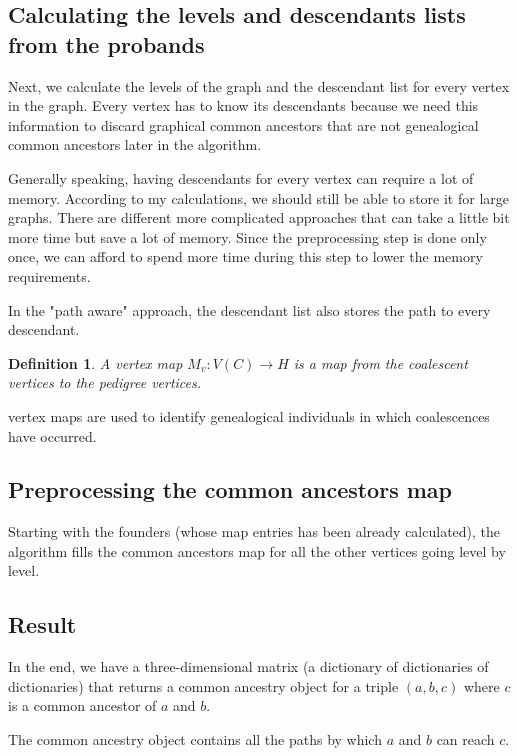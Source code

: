 \documentclass[14pt]{extarticle}
\newtheorem{definition}{Definition}
\begin{document}
\subsection{Calculating the levels and descendants lists from the probands}

Next, we calculate the levels of the graph and the descendant list for every vertex in the graph. Every vertex has to know its descendants because we need this information to discard graphical common ancestors that are not genealogical common ancestors later in the algorithm.

Generally speaking, having descendants for every vertex can require a lot of memory. According to my calculations, we should still be able to store it for large graphs. There are different more complicated approaches that can take a little bit more time but save a lot of memory. Since the preprocessing step is done only once, we can afford to spend more time during this step to lower the memory requirements.

In the "path aware" approach, the descendant list also stores the path to every descendant.



\begin{definition}
A vertex map $M_v:V(C) \rightarrow H$ is a map from the coalescent vertices to the pedigree vertices.   
\end{definition}
vertex maps are used to identify genealogical individuals in which coalescences have occurred. 

\subsection{Preprocessing the common ancestors map}

Starting with the founders (whose map entries has been already calculated), the algorithm fills the common ancestors map for all the other vertices going level by level.

\subsection{Result}

In the end, we have a three-dimensional matrix (a dictionary of dictionaries of dictionaries) that returns a common ancestry object for a triple $(a, b, c)$ where $c$ is a common ancestor of $a$ and $b$.

The common ancestry object contains all the paths by which $a$ and $b$ can reach $c$.
\end{document}
